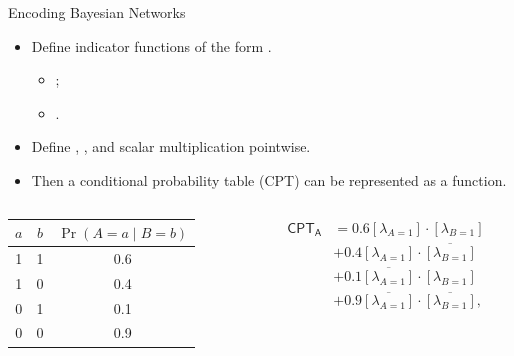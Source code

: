 \documentclass{beamer}
\begin{document}
\begin{frame}{Encoding Bayesian Networks}
  \begin{itemize}
  \item Define indicator functions of the form .
    \begin{itemize}
    \item {};
    \item {}.
    \end{itemize}
  \item Define \structure{$+$}, \structure{$\cdot$}, and scalar multiplication pointwise.
  \item Then a conditional probability table (CPT) can be represented as a function.
  \end{itemize}
  \begin{columns}[t]
    \begin{column}{0.5\textwidth}
      \centering
      \begin{tabular}[t]{ccc}
        \toprule
        $a$ & $b$ & $\Pr(A = a \mid B = b)$ \\
        \midrule
        1 & 1 & 0.6 \\
        1 & 0 & 0.4 \\
        0 & 1 & 0.1 \\
        0 & 0 & 0.9 \\
        \bottomrule
      \end{tabular}
    \end{column}
    \begin{column}{0.5\textwidth}
      \begin{align*}
        \mathsf{CPT_A} &= 0.6[\lambda_{A=1}] \cdot [\lambda_{B=1}] \\
                       &+ 0.4[\lambda_{A=1}] \cdot \overline{[\lambda_{B=1}]} \\
                       &+ 0.1\overline{[\lambda_{A=1}]} \cdot [\lambda_{B=1}] \\
                       &+ 0.9\overline{[\lambda_{A=1}]} \cdot \overline{[\lambda_{B=1}]},
      \end{align*}
    \end{column}
  \end{columns}
\end{frame}
\end{document}

